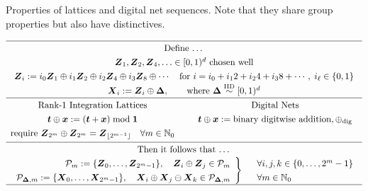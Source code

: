\documentclass[graybox]{svmult}
\begin{document}
\begin{table}[h]
	\centering
	\caption{Properties of lattices and digital net sequences.  Note that they share group properties but also have distinctives.} \label{tab:GroupProp}
\[
	\renewcommand{\arraystretch}{1.3}
\begin{array}{c@{\qquad}c}
	\hline
	\multicolumn{2}{c}{\text{Define \ldots}} \\
	\multicolumn{2}{c}{\boldsymbol{Z}_1, \boldsymbol{Z}_2, \boldsymbol{Z}_4, \ldots \in [0,1)^d \text{ chosen well} } \\
	\multicolumn{2}{c}{
	\boldsymbol{Z}_{i} := i_0  \boldsymbol{Z}_1 \oplus i_1 \boldsymbol{Z}_{2} \oplus i_2  \boldsymbol{Z}_{4} \oplus  i_3  \boldsymbol{Z}_{8} \oplus \cdots 
	\quad
	\text{for }i = i_0 +i_1 2 + i_2 4 + i_3 8 + \cdots, \; i_\ell \in \{0,1\}} \\
    \multicolumn{2}{c}{\boldsymbol{X}_i := \boldsymbol{Z}_i \oplus \boldsymbol{\Delta}, \qquad \text{where }\boldsymbol{\Delta} \overset{\textup{IID}}{\sim} [0,1)^d} \\  \hline
	\text{Rank-1 Integration Lattices} & \text{Digital Nets} \\
		\boldsymbol{t} \oplus \boldsymbol{x} : = (\boldsymbol{t} + \boldsymbol{x}) \bmod \boldsymbol{1} & \boldsymbol{t} \oplus \boldsymbol{x} := \text{binary digitwise addition}, \oplus_{\textup{dig}} \\ 
		\text{require } \boldsymbol{Z}_{2^{m}} \oplus \boldsymbol{Z}_{2^{m}} = \boldsymbol{Z}_{\lfloor2^{m-1}\rfloor}
		\quad \forall m \in \mathbb{N}_0 
		\\[.5ex]
\hline
\multicolumn{2}{c}{\text{Then it follows that \ldots}} \\
	\multicolumn{2}{c}{\left . \begin{array}{r}
			\mathcal{P}_m := \{\boldsymbol{Z}_0, \ldots, \boldsymbol{Z}_{2^m-1}\}, \quad
			\boldsymbol{Z}_i \oplus \boldsymbol{Z}_j \in \mathcal{P}_m \\
			\mathcal{P}_{\boldsymbol{\Delta},m} := \{\boldsymbol{X}_0, \ldots, \boldsymbol{X}_{2^m-1}\}, \quad
			\boldsymbol{X}_i \oplus \boldsymbol{X}_j \ominus \boldsymbol{X}_k \in \mathcal{P}_{\boldsymbol{\Delta},m}
	\end{array} \right \}\quad \begin{array}{l}\forall  i,j,k \in \{0, \ldots, 2^{m} -1\} \\ \forall m \in \mathbb{N}_0\end{array}} \\
\hline
\end{array}
\]
\end{table}
\end{document}
